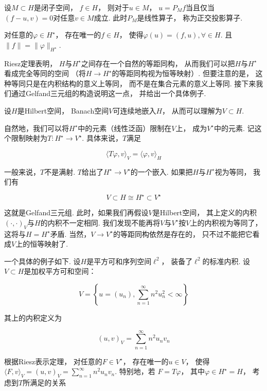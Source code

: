 \begin{corollary}
    设$M \subset H$是闭子空间，
    $f \in H$，
    则对于$u \in M$，
    $u = P_M f$当且仅当$(f-u , v) = 0$对任意$v \in M$成立.
    此时$P_M$是线性算子，
    称为正交投影算子.
\end{corollary}



\begin{theorem}[Riesz表示定理]
    对任意的$\varphi \in H^\star$，
    存在唯一的$f \in H$，
    使得$\varphi (u) = (f,u) , \forall \in H$.
    且$\| f \| = \| \varphi \|_{H^\star}$.
\end{theorem}

Riesz定理表明，
$H$与$H^{\star}$之间存在一个自然的等距同构，
从而我们可以把$H$与$H^{\star}$看成完全等同的空间
（将$H \to H^\star$的等距同构视为恒等映射）.
但要注意的是，
这种等同只是在内积结构的意义上等同，
而不是在集合元素的意义上等同.
接下来我们通过Gelfand三元组的构造说明这一点，
并给出一个具体例子.

\smallskip

设$H$是Hilbert空间，
Banach空间$V$可连续地嵌入$H$，
从而可以理解为$V \subset H$.

自然地，我们可以将$H^\star$中的元素（线性泛函）限制在$V$上，
成为$V^\star$中的元素.
记这个限制映射为$T: H^\star \to V^\star$.
具体来说，$T$满足

\[
\langle T\varphi , v \rangle_{V} = 
\langle \varphi , v \rangle_{H} 
\]


一般来说，$T$不是满射.
$T$给出了$H^\star \to V^\star$的一个嵌入.
如果把$H$与$H^\star$视为等同，
我们有

\[
V \subset H \cong H^\star \subset V^{\star}
\]

这就是Gelfand三元组.
此时，如果我们再假设$V$是Hilbert空间，
其上定义的内积$(\cdot , \cdot)_V$与$H$的内积不一定相同.
我们发现不能再将$V$与$V^\star$按$V$上的内积视为等同了，
这将与$H = H^\star$矛盾.
当然，$V \to V^\star$的等距同构依然是存在的，
只不过不能把它看成$V$上的恒等映射了.

\smallskip

一个具体的例子如下.
设$H$是平方可和序列空间$\ell^2$，
装备了$\ell^2$的标准内积.
设$V \subset H$是加权平方可和空间：

\[
V = \left\{ u = (u_n) , \sum_{n=1}^{\infty} n^2 u_n^2 < \infty \right\}
\]

其上的内积定义为

\[
(u , v)_{V} = \sum_{n=1}^\infty n^2 u_n v_n
\]


根据Riesz表示定理，
对任意的$F \in V^{\star}$，
存在唯一的$u \in V$，
使得$\langle F , v \rangle_V = (u , v)_V = \sum_{n=1}^\infty n^2 u_n v_n$.
特别地，若
$F = T \varphi$，
其中$ \varphi \in H^\star = H$，
考虑到$T$所满足的关系

